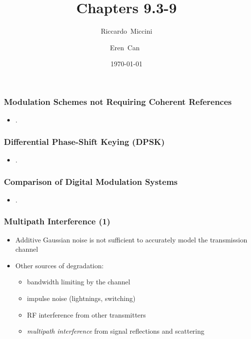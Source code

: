 \documentclass{beamer}
\title{Chapters 9.3-9}
\subtitle{}
\author[Riccardo \and Eren]{Riccardo~Miccini\inst{1} \and Eren~Can~\inst{1}}
\institute[DTU]
{
	\inst{1}
	Technical University of Denmark\\
	Digital Communication
}
\date{\today}
\begin{document}
\frame{\titlepage}

\begin{frame}
	\frametitle{Modulation Schemes not Requiring Coherent References}
	\begin{itemize}
		\item .
	\end{itemize}
\end{frame}

\begin{frame}
	\frametitle{Differential Phase-Shift Keying  (DPSK)}
	\begin{itemize}
		\item .
	\end{itemize}
\end{frame}


\begin{frame}
	\frametitle{Comparison of Digital Modulation Systems}
	\begin{itemize}
		\item .
	\end{itemize}
\end{frame}


\begin{frame}
	\frametitle{Multipath Interference (1)}
	\begin{itemize}
		\item Additive Gaussian noise is not sufficient to accurately model the transmission channel
		\item Other sources of degradation:
		\begin{itemize}
			\item bandwidth limiting by the channel
			\item impulse noise (lightnings, switching)
			\item RF interference from other transmitters
			\item \emph{multipath interference} from signal reflections and scattering
		\end{itemize}
	\end{itemize}
\end{frame}
\end{document}
